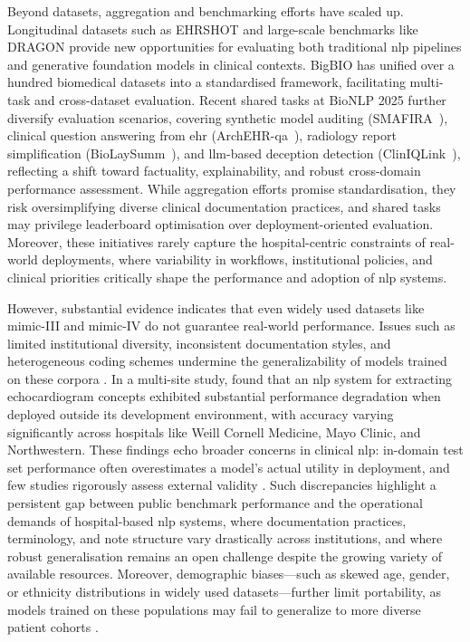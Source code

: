 Beyond datasets, aggregation and benchmarking efforts have scaled up. Longitudinal datasets such as EHRSHOT \citep{wornowEHRSHOTEHRBenchmark2023} and large-scale benchmarks like DRAGON \citep{bosmaDRAGONBenchmarkClinical2025} provide new opportunities for evaluating both traditional \gls{nlp} pipelines and generative foundation models in clinical contexts. BigBIO \citep{friesBigBIOFrameworkDataCentric2022} has unified over a hundred biomedical datasets into a standardised framework, facilitating multi-task and cross-dataset evaluation. Recent shared tasks at BioNLP 2025 further diversify evaluation scenarios, covering synthetic model auditing (SMAFIRA~\citep{neves-etal-2025-smafira}), clinical question answering from \gls{ehr} (ArchEHR-\gls{qa}~\citep{soni-demnerfushman-2025-archehrqa}), radiology report simplification (BioLaySumm~\citep{xiao-etal-2025-biolaysumm}), and \gls{llm}-based deception detection (ClinIQLink~\citep{colelough-etal-2025-cliniqlink}), reflecting a shift toward factuality, explainability, and robust cross-domain performance assessment. While aggregation efforts promise standardisation, they risk oversimplifying diverse clinical documentation practices, and shared tasks may privilege leaderboard optimisation over deployment-oriented evaluation. Moreover, these initiatives rarely capture the hospital-centric constraints of real-world deployments, where variability in workflows, institutional policies, and clinical priorities critically shape the performance and adoption of \gls{nlp} systems.

However, substantial evidence indicates that even widely used datasets like \gls{mimic}-III and \gls{mimic}-IV do not guarantee real-world performance. Issues such as limited institutional diversity, inconsistent documentation styles, and heterogeneous coding schemes undermine the generalizability of models trained on these corpora \citep{elangovanPrinciplesClinicalResearch2024}. In a multi-site study, \citet{adekkanattuEvaluatingPortabilityNLP2019} found that an \gls{nlp} system for extracting echocardiogram concepts exhibited substantial performance degradation when deployed outside its development environment, with accuracy varying significantly across hospitals like Weill Cornell Medicine, Mayo Clinic, and Northwestern. These findings echo broader concerns in clinical \gls{nlp}: in-domain test set performance often overestimates a model’s actual utility in deployment, and few studies rigorously assess external validity \citep{frailenavarroClinicalNamedEntity2023}. Such discrepancies highlight a persistent gap between public benchmark performance and the operational demands of hospital-based \gls{nlp} systems, where documentation practices, terminology, and note structure vary drastically across institutions, and where robust generalisation remains an open challenge despite the growing variety of available resources. Moreover, demographic biases—such as skewed age, gender, or ethnicity distributions in widely used datasets—further limit portability, as models trained on these populations may fail to generalize to more diverse patient cohorts \cite{roosli2022fairness,pmlr-v106-nestor19a}.

